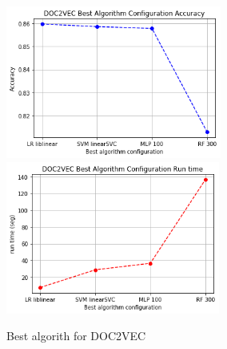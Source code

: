 \documentclass[oneside,onecolumn]{article}
\begin{document}
\begin{figure}[H]
	\centering
	
	\includegraphics[height=5cm]{report_plot/plot_doc2vec/best_accuracy.png}
	\includegraphics[height=5cm]{report_plot/plot_doc2vec/best_alg_runtime.png}
	
	\caption{Best algorith for DOC2VEC} 
	\label{fig:lowmutation}
\end{figure}
\end{document}
